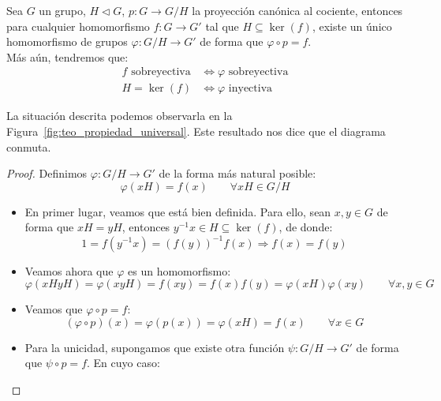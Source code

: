 \begin{teo}\label{teo:prop_universal}
    Sea $G$ un grupo, $H\lhd G$, $p:G\to G/H$ la proyección canónica al cociente, entonces para cualquier homomorfismo $f:G\to G'$ tal que $H\subseteq \ker(f)$, existe un único homomorfismo de grupos $\varphi:G/H\to G'$ de forma que $\varphi\circ p = f$.\\

    \noindent
    Más aún, tendremos que:
    \begin{align*}
        f \text{\ sobreyectiva} &\Longleftrightarrow \varphi \text{\ sobreyectiva}\\
        H = \ker(f) &\Longleftrightarrow \varphi \text{\ inyectiva}
    \end{align*}

    \noindent
    La situación descrita podemos observarla en la Figura~\ref{fig:teo_propiedad_universal}. Este resultado nos dice que el diagrama conmuta.
    \begin{proof}
        Definimos $\varphi:G/H\to G'$ de la forma más natural posible:
        \begin{equation*}
            \varphi(xH) = f(x) \qquad \forall xH \in G/H
        \end{equation*}
        \begin{itemize}
            \item En primer lugar, veamos que está bien definida. Para ello, sean $x,y\in G$ de forma que $xH = yH$, entonces $y^{-1}x\in H\subseteq \ker(f)$, de donde:
                \begin{equation*}
                    1 = f(y^{-1}x) = {(f(y))}^{-1}f(x) \Longrightarrow f(x) = f(y)
                \end{equation*}
            \item Veamos ahora que $\varphi$ es un homomorfismo:
                \begin{equation*}
                    \varphi(xHyH) = \varphi(xyH) = f(xy) = f(x) f(y) = \varphi(xH)\varphi(xy) \qquad \forall x,y\in G
                \end{equation*}
            \item Veamos que $\varphi\circ p = f$:
                \begin{equation*}
                    (\varphi \circ p)(x) = \varphi(p(x)) = \varphi(xH) = f(x) \qquad \forall x\in G
                \end{equation*}
            \item Para la unicidad, supongamos que existe otra función $\psi:G/H\to G'$ de forma que $\psi\circ p = f$. En cuyo caso:

\end{itemize}
\end{proof}
\end{teo}
